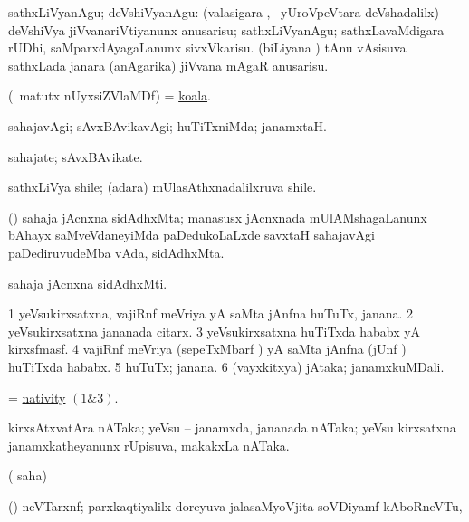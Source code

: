 \noindent
\gl{\pagu}
\bmng
  sathxLiVyanAgu; deVshiVyanAgu: 
\banum
{} (valasigara \vi, \kanmu\ yUroVpeVtara deVshadalilx) deVshiVya jiVvanariVtiyanunx anusarisu; sathxLiVyanAgu; sathxLavaMdigara rUDhi, saMparxdAyagaLanunx sivxVkarisu. 
 (biLiyana \vi) tAnu vAsisuva sathxLada janara (anAgarika) jiVvana mAgaR anusarisu. 
\eanum
\emng
\eentry

\bentry
{}
\gl{\nA}
\bmng
(\AseTxrXV\ matutx nUyxsiZVlaMDf) = \hyperref{kandict_k.pdf}{K}{koala}{koala}. 
\emng
\eentry

\bentry
{}
\gl{\kirxvi}
\bmng
sahajavAgi; sAvxBAvikavAgi; huTiTxniMda; janamxtaH. 
\emng
\eentry

\bentry
{}
\gl{\nA}
\bmng
sahajate; sAvxBAvikate. 
\emng
\eentry

\bentry
{}
\gl{\nA}
\bmng
sathxLiVya shile; (adara) mUlasAthxnadalilxruva shile. 
\emng
\eentry

\bentry
{}
\gl{\nA}
\bmng
(\tashA) sahaja jAcnxna sidAdhxMta; manasusx jAcnxnada mUlAMshagaLanunx bAhayx saMveVdaneyiMda paDedukoLaLxde savxtaH sahajavAgi paDediruvudeMba vAda, sidAdhxMta. 
\emng
\eentry

\bentry
{}
\gl{\nA}
\bmng
sahaja jAcnxna sidAdhxMti. 
\emng
\eentry

\bentry
{}
\gl{\nA}
\bmng
\bnum
\num{1} yeVsukirxsatxna, vajiRnf meVriya yA saMta jAnfna huTuTx, janana. 
\num{2} yeVsukirxsatxna jananada citarx. 
\num{3} yeVsukirxsatxna huTiTxda hababx yA kirxsfmasf. 
\num{4} vajiRnf meVriya (sepeTxMbarf ) yA saMta jAnfna (jUnf ) huTiTxda hababx. 
\num{5} huTuTx; janana. 
\num{6} (vayxkitxya) jAtaka; janamxkuMDali. 
\enum
\emng

\noindent
\gl{\pagu}
\bmng
{} = \hyperlink{nativity}{nativity} \((1 \& 3)\). 
\emng
\eentry


\bentry
{}
\gl{\nA}
\bmng
kirxsAtxvatAra nATaka; yeVsu -- janamxda, jananada nATaka; yeVsu kirxsatxna janamxkatheyanunx rUpisuva, makakxLa nATaka. 
\emng
\eentry

\bentry
{}
\gl{\saMkiSx}
\bmng
( saha)  
\emng
\eentry

\bentry
{}
\gl{\nA}
\bmng
(\ravi) neVTarxnf; parxkaqtiyalilx doreyuva jalasaMyoVjita soVDiyamf kAboRneVTu,  
\emng
\eentry

